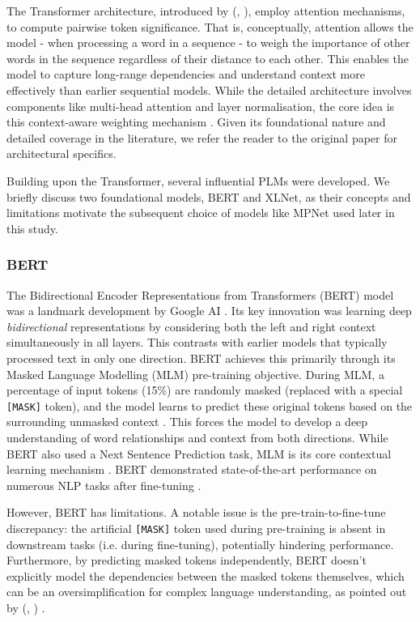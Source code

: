 \documentclass[10pt,oneside]{report}
\renewcommand{\citet}[1]{\citeauthor{#1}, \citeyear{#1}}
\begin{document}
The Transformer architecture, introduced by (\citet{vaswani2017attention}), employ attention mechanisms, to compute pairwise token significance. That is, conceptually, attention allows the model - when processing a word in a sequence - to weigh the importance of other words in the sequence regardless of their distance to each other. This enables the model to capture long-range dependencies and understand context more effectively than earlier sequential models. While the detailed architecture involves components like multi-head attention and layer normalisation, the core idea is this context-aware weighting mechanism \cite{vaswani2017attention}. Given its foundational nature and detailed coverage in the literature, we refer the reader to the original paper for architectural specifics.

Building upon the Transformer, several influential PLMs were developed. We briefly discuss two foundational models, BERT and XLNet, as their concepts and limitations motivate the subsequent choice of models like MPNet used later in this study.

\subsubsection{BERT}
The Bidirectional Encoder Representations from Transformers (BERT) model was a landmark development by Google AI \cite{devlin2019bert}. Its key innovation was learning deep \textit{bidirectional} representations by considering both the left and right context simultaneously in all layers. This contrasts with earlier models that typically processed text in only one direction. BERT achieves this primarily through its Masked Language Modelling (MLM) pre-training objective. During MLM, a percentage of input tokens (15\%) are randomly masked (replaced with a special \texttt{[MASK]} token), and the model learns to predict these original tokens based on the surrounding unmasked context \cite{devlin2019bert}. This forces the model to develop a deep understanding of word relationships and context from both directions. While BERT also used a Next Sentence Prediction task, MLM is its core contextual learning mechanism \cite{song2020mpnet}. BERT demonstrated state-of-the-art performance on numerous NLP tasks after fine-tuning \cite{devlin2019bert}.

However, BERT has limitations. A notable issue is the pre-train-to-fine-tune discrepancy: the artificial \texttt{[MASK]} token used during pre-training is absent in downstream tasks (i.e. during fine-tuning), potentially hindering performance. Furthermore, by predicting masked tokens independently, BERT doesn't explicitly model the dependencies between the masked tokens themselves, which can be an oversimplification for complex language understanding, as pointed out by (\citet{schank1972conceptual}) \cite{yang2019xlnet}.
\end{document}
